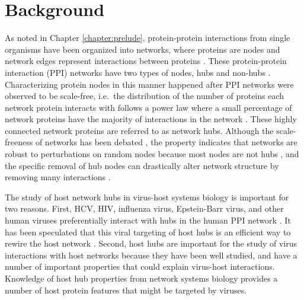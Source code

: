 \section{Background}

As noted in Chapter \ref{chapter:prelude}, protein-protein
interactions from single organisms have been organized into networks,
where proteins are nodes and network edges represent interactions
between proteins \cite{han04}. These protein-protein interaction (PPI)
networks have two types of nodes, hubs and non-hubs
\cite{barabási2004network}. Characterizing protein nodes in this
manner happened after PPI networks were observed to be scale-free,
i.e.\, the distribution of the number of proteins each network protein
interacts with follows a power law where a small percentage of network
proteins have the majority of interactions in the network
\cite{jeong2001lethality}. These highly connected network proteins are
referred to as network hubs. Although the scale-freeness of networks
has been debated
\cite{han2005effect,rachlin2006biological,stumpf2005subnets}, the
property indicates that networks are robust to perturbations on random
nodes because most nodes are not hubs
\cite{albert2000error,li2006protein}, and the specific removal of hub
nodes can drastically alter network structure by removing many
interactions \cite{albert2000error,li2006protein}.

The study of host network hubs in virus-host systems biology is
important for two reasons. First, HCV, HIV, influenza virus,
Epstein-Barr virus, and other human viruses preferentially interact
with hubs in the human PPI network
\cite{calderwood07,dyer08,dechassey08,tastan09}. It has been
speculated that this viral targeting of host hubs is an efficient way
to rewire the host network \cite{calderwood07}. Second, host hubs are
important for the study of virus interactions with host networks
because they have been well studied, and have a number of important
properties that could explain virus-host interactions. Knowledge of
host hub properties from network systems biology provides a number of
host protein features that might be targeted by viruses.

